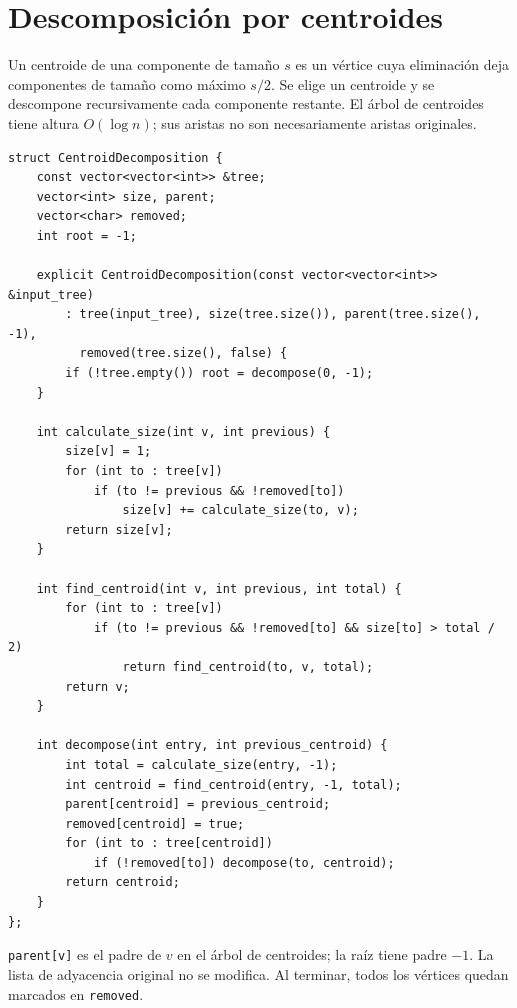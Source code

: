 \section{Descomposici\'on por centroides}

Un centroide de una componente de tama\~no $s$ es un v\'ertice cuya eliminaci\'on
deja componentes de tama\~no como m\'aximo $s/2$. Se elige un centroide y se
descompone recursivamente cada componente restante. El \'arbol de centroides
tiene altura $O(\log n)$; sus aristas no son necesariamente aristas originales.


\begin{lstlisting}[style=cpp]
struct CentroidDecomposition {
    const vector<vector<int>> &tree;
    vector<int> size, parent;
    vector<char> removed;
    int root = -1;

    explicit CentroidDecomposition(const vector<vector<int>> &input_tree)
        : tree(input_tree), size(tree.size()), parent(tree.size(), -1),
          removed(tree.size(), false) {
        if (!tree.empty()) root = decompose(0, -1);
    }

    int calculate_size(int v, int previous) {
        size[v] = 1;
        for (int to : tree[v])
            if (to != previous && !removed[to])
                size[v] += calculate_size(to, v);
        return size[v];
    }

    int find_centroid(int v, int previous, int total) {
        for (int to : tree[v])
            if (to != previous && !removed[to] && size[to] > total / 2)
                return find_centroid(to, v, total);
        return v;
    }

    int decompose(int entry, int previous_centroid) {
        int total = calculate_size(entry, -1);
        int centroid = find_centroid(entry, -1, total);
        parent[centroid] = previous_centroid;
        removed[centroid] = true;
        for (int to : tree[centroid])
            if (!removed[to]) decompose(to, centroid);
        return centroid;
    }
};
\end{lstlisting}

\texttt{parent[v]} es el padre de $v$ en el \'arbol de centroides;
la ra\'iz tiene padre $-1$. La lista de adyacencia original no se modifica.
Al terminar, todos los v\'ertices quedan marcados en \texttt{removed}.

